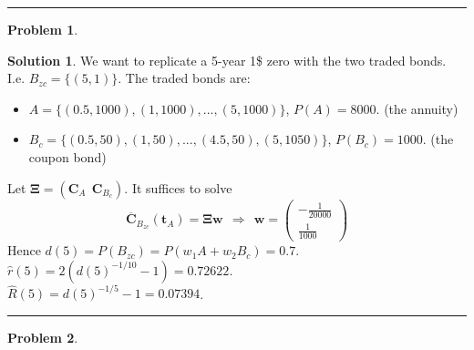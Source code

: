 \documentclass[a4paper, 10pt]{article}
\theoremstyle{definition}
\newtheorem{problem}{Problem}
\theoremstyle{hSol}
\newtheorem*{solution}{Solution}
\begin{document}
\noindent\rule{16cm}{0.4pt}

\begin{problem} 
\end{problem}
\begin{solution} We want to replicate a 5-year 1\$ zero with the two traded bonds. I.e. $B_{zc} = \{(5, 1)\}$. The traded bonds are:
\begin{itemize}
  \item[] $A = \{(0.5, 1000), (1, 1000), ..., (5, 1000)\}$, $P(A)=8000$. (the annuity)
  \item[] $B_c = \{(0.5, 50), (1, 50), ..., (4.5, 50), (5, 1050)\}$, $P(B_c)=1000$. (the coupon bond)
\end{itemize}
Let $\bm{\Xi} = (\bm{C}_A~~ \bm{C}_{B_c})$. It suffices to solve
$$
\overline{\bm{C}}_{B_{zc}}(\bm{t}_A) = \bm{\Xi} \bm{w} ~~\Rightarrow~~ \bm{w} = \begin{pmatrix}
  -\frac{1}{20000} \\
  \frac{1}{1000}
\end{pmatrix}
$$
Hence
$d(5) = P(B_{zc}) = P(w_1 A + w_2 B_c) = 0.7$. $\hat{r}(5) = 2(d(5)^{-1/10}-1)=0.72622$.\\
$\hat{R}(5) = d(5)^{-1/5}-1 = 0.07394$.
\end{solution}

\noindent\rule{16cm}{0.4pt}

\begin{problem} 
\end{problem}
\end{document}
